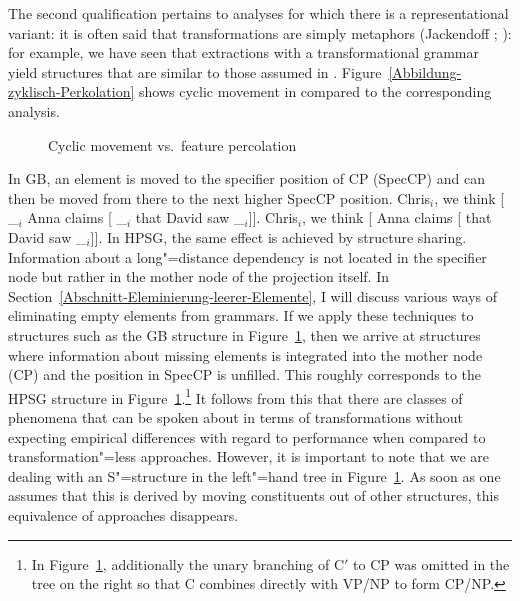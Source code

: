 The second qualification pertains to analyses for which there is a representational variant: it is often said that transformations are simply
metaphors (Jackendoff \citeyear[--23]{Jackendoff2000a}; \citeyear[, 20]{Jackendoff2007a}): for example, we have seen that extractions with a transformational grammar yield structures that
are similar to those assumed in \hpsg. Figure~\vref{Abbildung-zyklisch-Perkolation} shows cyclic movement in \gbt compared
to the corresponding \hpsg analysis.
\begin{figure}
\hfill%
\hfill
{}
\hfill\mbox{}%
\caption{Cyclic movement vs.\ feature percolation}\label{Abbildung-zyklisch-Perkolation}
\end{figure}%

In GB, an element is moved to the specifier position of CP (SpecCP) and can then be moved from there to the next higher SpecCP position.
\eal\settowidth{}
\ex
Chris$_i$, we think [ \_$_i$ Anna claims [ \_$_i$ that David saw \_$_i$]].
\ex
Chris$_i$, we think [ Anna claims [ that David saw \_$_i$]].
\zl
In HPSG, the same effect is achieved by structure sharing. Information about a long"=distance dependency
is not located in the specifier node but rather in the mother node of the projection itself. In Section~\ref{Abschnitt-Eleminierung-leerer-Elemente},
I will discuss various ways of eliminating empty elements from grammars. If we apply these techniques to structures such as the GB structure
in Figure~\ref{Abbildung-zyklisch-Perkolation}, then we arrive at structures where information about missing elements is integrated into the
mother node (CP) and the position in SpecCP is unfilled. This roughly corresponds to the HPSG structure in Figure~\ref{Abbildung-zyklisch-Perkolation}.\footnote{ 
In Figure~\ref{Abbildung-zyklisch-Perkolation}, additionally the unary branching of C$'$ to CP was omitted in the tree on the right so that C combines directly with VP/NP
to form CP/NP.%
}
It follows from this that there are classes of phenomena that
can be spoken about in terms of transformations without expecting empirical differences with regard to
performance when compared to transformation"=less approaches.
However, it is important to note that we are dealing with an S"=structure in the left"=hand tree in Figure~\ref{Abbildung-zyklisch-Perkolation}. As soon as one assumes
that this is derived by moving constituents out of other structures, this equivalence of approaches disappears.

